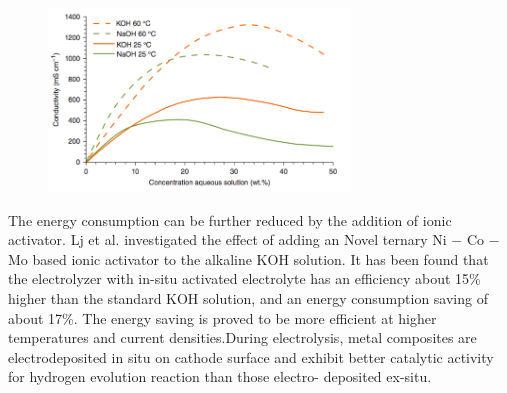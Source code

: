 \begin{figure}[H]
\centering
\includegraphics[width=8cm]{electrolytematerial.png}
\end{figure}
The energy consumption can be further reduced by the addition of ionic activator. Lj et al. \cite{ionic}investigated the effect of adding an Novel ternary Ni $-$ Co $-$ Mo based ionic activator to the alkaline KOH solution. It has been found that the electrolyzer with in-situ activated electrolyte has an efficiency about 15\% higher than the standard KOH solution, and an energy consumption saving of about 17\%. The energy saving is proved to be more efficient at higher temperatures and current densities.During electrolysis, metal composites are electrodeposited in situ on cathode surface and exhibit better catalytic activity for hydrogen evolution reaction than those electro- deposited ex-situ. 

